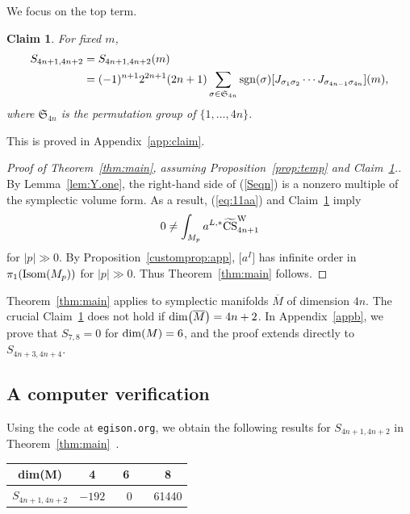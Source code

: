 \documentclass[10pt,a4paper]{amsart}
\numberwithin{equation}{section}
\newtheorem{Claim}[Theorem]{Claim}
\theoremstyle{definition}
\newcommand{\ocs}{\widetilde{{\rm CS}}}
\newcommand{\sgn}{{\rm sgn}}
\newcommand{\om}{\overline{M}}
\newcommand{\omp}{M_p}
\newcommand{\isom}{{\rm Isom}}
\begin{document}
We focus on the top term.

\begin{Claim}\label{claim1}
For fixed $m$,
\begin{align}
S_{4n+1,4n+2} &= S_{4n+1,4n+2}(m) \nonumber\\
&=(-1)^{n+1} 2^{2n+1}(2n+1)
\sum_{\sigma \in \mathfrak S_{4n}} \sgn(\sigma) [J_{\sigma_1 \sigma_2} \cdots J_{\sigma_{4n-1} \sigma_{4n}} ](m),\label{Seqn}
\end{align}
where $\mathfrak S_{4n}$ is the permutation group of $\{1,\dots, 4n\}$.
\end{Claim}

This is proved in Appendix~\ref{app:claim}.

\begin{proof}[Proof of Theorem~\ref{thm:main}, assuming Proposition~\ref{prop:temp} and Claim~\ref{claim1}.]
By Lem\-ma~\ref{lem:Y.one}, the \linebreak right-hand side of (\ref{Seqn}) is a nonzero multiple of the symplectic volume form.
As a result, (\ref{eq:11aa}) and Claim~\ref{claim1} imply
\[0\neq \int_{\omp}a^{L,*}\ocs^{\rm W}_{4n+1}\]
for $|p| \gg 0$.
By Proposition~\ref{customprop:app}, $\bigl[a^I\bigr]$ has infinite order in $\pi_1(\isom(\omp))$ for $|p| \gg 0$.
Thus Theorem~\ref{thm:main} follows.
\end{proof}


Theorem~\ref{thm:main} applies to symplectic manifolds $\om$ of dimension $4n$. The crucial Claim~\ref{claim1} does not hold if ${\rm dim}\bigl(\om\bigr) = 4n+2$. In Appendix~\ref{appb}, we prove that $S_{7,8} = 0$ for ${\rm dim}(M) = 6$, and the proof extends directly to $S_{4n+3, 4n+4}$.

\subsection{A computer verification}\label{section3.2}

Using the code at {\tt egison.org}, we obtain the following results for
$S_{4n+1, 4n+2}$
in Theorem~\ref{thm:main}~\cite{Egi1}.

\begin{center}\begin{tabular}{|c||c|c|c|}
\hline
dim(M) & 4&\ 6\ \ &8\\
\hline
$S_{4n+1,4n+2}$ & $-192$&0 &61440\\
\hline
\end{tabular}
\end{center}
\end{document}
